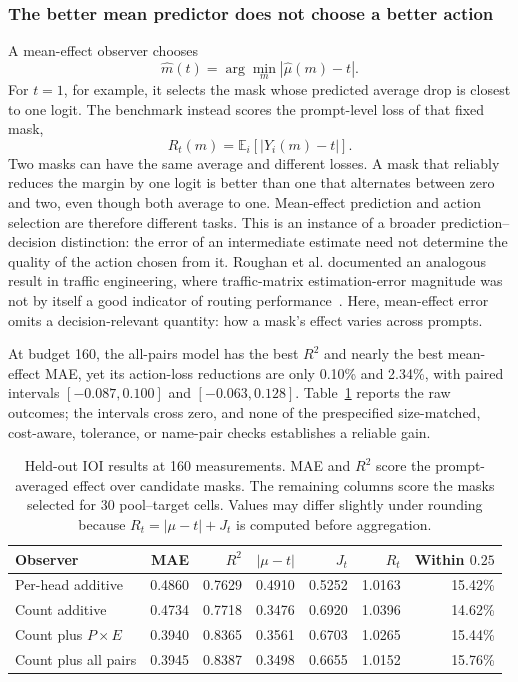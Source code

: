 \subsubsection{The better mean predictor does not choose a better action}
\label{sec:ioi-prediction-decision}

A mean-effect observer chooses
\[
\widehat m(t)=\arg\min_m |\widehat\mu(m)-t|.
\]
For $t=1$, for example, it selects the mask whose predicted average drop is
closest to one logit. The benchmark instead scores the prompt-level loss of
that fixed mask,
\[
R_t(m)=\mathbb E_i\left[|Y_i(m)-t|\right].
\]
Two masks can have the same average and different losses. A mask that reliably
reduces the margin by one logit is better than one that alternates between zero
and two, even though both average to one. Mean-effect prediction and action
selection are therefore different tasks. This is an instance of a broader
prediction--decision distinction: the error of an intermediate estimate need
not determine the quality of the action chosen from it. Roughan et al.
documented an analogous result in traffic engineering, where traffic-matrix
estimation-error magnitude was not by itself a good indicator of routing
performance~\cite{roughan2003te}. Here, mean-effect error omits a
decision-relevant quantity: how a mask's effect varies across prompts.

At budget 160, the all-pairs model has the best $R^2$ and nearly the best
mean-effect MAE, yet its action-loss reductions are only 0.10\% and 2.34\%, with
paired intervals $[-0.087,0.100]$ and $[-0.063,0.128]$. Table~\ref{tab:ioi-phase5}
reports the raw outcomes; the intervals cross zero, and none of the
prespecified size-matched, cost-aware, tolerance, or name-pair checks
establishes a reliable gain.

\begin{table}[H]
\centering
\scriptsize
\begin{tabular}{@{}lrrrrrr@{}}
\toprule
Observer & MAE & $R^2$ & $|\mu-t|$ & $J_t$ & $R_t$ & Within $0.25$ \\
\midrule
Per-head additive & 0.4860 & 0.7629 & 0.4910 & 0.5252 & 1.0163 & 15.42\% \\
Count additive & 0.4734 & 0.7718 & 0.3476 & 0.6920 & 1.0396 & 14.62\% \\
Count plus $P\!\times\!E$ & 0.3940 & 0.8365 & 0.3561 & 0.6703 & 1.0265 & 15.44\% \\
Count plus all pairs & 0.3945 & 0.8387 & 0.3498 & 0.6655 & 1.0152 & 15.76\% \\
\bottomrule
\end{tabular}
\caption{Held-out IOI results at 160 measurements. MAE and $R^2$
score the prompt-averaged effect over candidate masks. The remaining columns
score the masks selected for 30 pool--target cells. Values may differ slightly
under rounding because $R_t=|\mu-t|+J_t$ is computed before aggregation.}
\label{tab:ioi-phase5}
\end{table}

